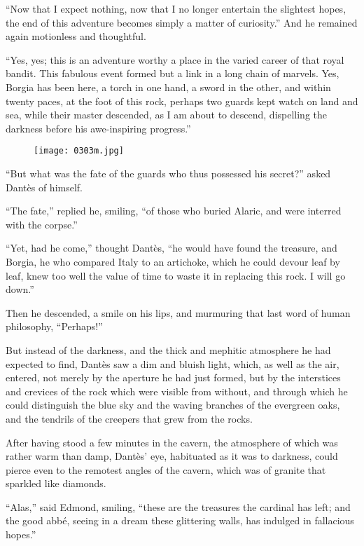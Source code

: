 “Now that I expect nothing, now that I no longer entertain the
slightest hopes, the end of this adventure becomes simply a matter of
curiosity.” And he remained again motionless and thoughtful.

“Yes, yes; this is an adventure worthy a place in the varied career of
that royal bandit. This fabulous event formed but a link in a long
chain of marvels. Yes, Borgia has been here, a torch in one hand, a
sword in the other, and within twenty paces, at the foot of this rock,
perhaps two guards kept watch on land and sea, while their master
descended, as I am about to descend, dispelling the darkness before his
awe-inspiring progress.”

\begin{figure}[ht]
\texttt{[image: 0303m.jpg]}
\end{figure}

“But what was the fate of the guards who thus possessed his secret?”
asked Dantès of himself.

“The fate,” replied he, smiling, “of those who buried Alaric, and were
interred with the corpse.”

“Yet, had he come,” thought Dantès, “he would have found the treasure,
and Borgia, he who compared Italy to an artichoke, which he could
devour leaf by leaf, knew too well the value of time to waste it in
replacing this rock. I will go down.”

Then he descended, a smile on his lips, and murmuring that last word of
human philosophy, “Perhaps!”

But instead of the darkness, and the thick and mephitic atmosphere he
had expected to find, Dantès saw a dim and bluish light, which, as well
as the air, entered, not merely by the aperture he had just formed, but
by the interstices and crevices of the rock which were visible from
without, and through which he could distinguish the blue sky and the
waving branches of the evergreen oaks, and the tendrils of the creepers
that grew from the rocks.

After having stood a few minutes in the cavern, the atmosphere of which
was rather warm than damp, Dantès’ eye, habituated as it was to
darkness, could pierce even to the remotest angles of the cavern, which
was of granite that sparkled like diamonds.

“Alas,” said Edmond, smiling, “these are the treasures the cardinal has
left; and the good abbé, seeing in a dream these glittering walls, has
indulged in fallacious hopes.”

